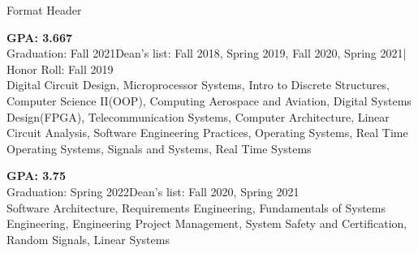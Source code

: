 \documentclass[10pt]{article}
\newcommand{\entrySpacing}{4pt}
\begin{document}
{Format}
{Header}

\topHeader

\noindent\begin{minipage}{\linewidth}
 \hfill \textbf{GPA: 3.667}\\
Graduation: Fall 2021\hfill Dean’s list: Fall 2018, Spring 2019, Fall 2020, Spring 2021| Honor Roll: Fall 2019\\Digital Circuit Design, Microprocessor Systems, Intro to Discrete Structures, Computer Science II(OOP), Computing Aerospace and Aviation, Digital Systems Design(FPGA), Telecommunication Systems, Computer Architecture, Linear Circuit Analysis, Software Engineering Practices, Operating Systems, Real Time Operating Systems, Signals and Systems, Real Time Systems

\end{minipage}
\vspace{\entrySpacing}

\noindent\begin{minipage}{\linewidth}
 \hfill \textbf{GPA: 3.75}\\
Graduation: Spring 2022\hfill Dean's list: Fall 2020, Spring 2021\\Software Architecture, Requirements Engineering, Fundamentals of Systems Engineering, Engineering Project Management, System Safety and Certification, Random Signals, Linear Systems

\end{minipage}
\vspace{\entrySpacing}
\end{document}
